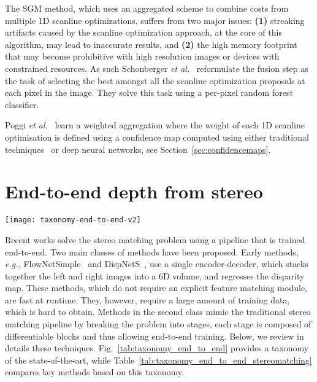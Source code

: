 \documentclass[10pt,journal,compsoc]{IEEEtran}
\newcommand{\eg}{\emph{e.g., }}
\newcommand{\etal}{\emph{et al.}}
\begin{document}
The SGM method, which uses an aggregated scheme to combine costs from multiple 1D scanline optimizations, suffers from two major issues: \textbf{(1)} streaking artifacts caused by the scanline optimization approach, at the core of this algorithm, may lead to inaccurate results,  and \textbf{(2)}  the high memory footprint that may become prohibitive with high resolution images or devices with constrained resources. As such Schonberger \etal~\cite{schonberger2018learning} reformulate the fusion step as the task of selecting the best amongst all the scanline optimization proposals at each pixel in the image. They  solve this task using   a per-pixel random forest classifier.


Poggi \etal~\cite{poggi2016learning} learn a weighted aggregation where the weight of each 1D scanline optimisation  is defined using a confidence map computed using either traditional techniques~\cite{hu2012quantitative}  or deep neural networks, see Section~\ref{sec:confidencemaps}. 



\section{End-to-end depth from stereo}
\label{sec:end_to_end_stereo}
\begin{figure*}[t]
\centering
\texttt{[image: taxonomy-end-to-end-v2]}
	\caption{\label{tab:taxonomy_end_to_end} Taxonomy of the network architectures  for stereo-based disparity estimation using end-to-end deep learning. }
\end{figure*}




Recent works solve the stereo matching problem using a pipeline that is trained end-to-end. Two main classes of methods have been proposed.  Early methods, \eg FlowNetSimple~\cite{dosovitskiy2015flownet} and DispNetS~\cite{mayer2016large}, use a single encoder-decoder, which stacks together the left and right images into a 6D volume, and regresses the disparity map. These methods, which do not require an explicit feature matching module, are fast at runtime. They, however, require a large amount of training data, which is hard to obtain. Methods in the second class mimic the traditional stereo matching pipeline by breaking the problem into stages, each stage is composed of differentiable blocks and thus allowing end-to-end training. Below, we review in details these techniques. Fig.~\ref{tab:taxonomy_end_to_end} provides a taxonomy of the state-of-the-art, while Table~\ref{tab:taxonomy_end_to_end_stereomatching} compares  key methods based on this taxonomy.
\end{document}
